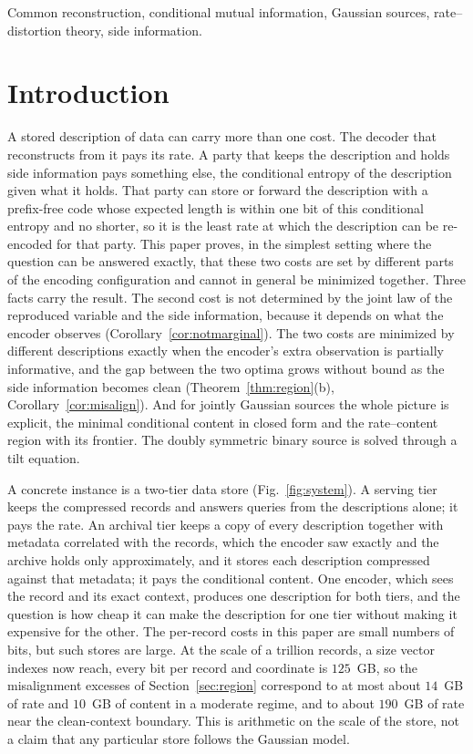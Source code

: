 \documentclass[11pt,onecolumn]{IEEEtran}
\begin{document}
\begin{IEEEkeywords}
Common reconstruction, conditional mutual information, Gaussian sources,
rate--distortion theory, side information.
\end{IEEEkeywords}

\section{Introduction}
\label{sec:intro}

A stored description of data can carry more than one cost. The decoder
that reconstructs from it pays its rate. A party that keeps the description
and holds side information pays something else, the conditional entropy
of the description given what it holds. That party can store or forward
the description with a prefix-free code whose expected length is within
one bit of this conditional entropy and no shorter, so it is the least
rate at which the description can be re-encoded for that party. This
paper proves, in the simplest setting where the question can be answered
exactly, that these two costs are set by different parts of the encoding
configuration and cannot in general be minimized together. Three facts
carry the result. The second cost is not determined by the joint law of
the reproduced variable and the side information, because it depends on
what the encoder observes (Corollary~\ref{cor:notmarginal}). The two costs
are minimized by different descriptions exactly when the encoder's extra
observation is partially informative, and the gap between the two optima
grows without bound as the side information becomes clean
(Theorem~\ref{thm:region}(b), Corollary~\ref{cor:misalign}). And for jointly
Gaussian sources the whole picture is explicit, the minimal conditional
content in closed form and the rate--content region with its frontier.
The doubly symmetric binary source is solved through a tilt equation.

A concrete instance is a two-tier data store (Fig.~\ref{fig:system}). A
serving tier keeps the compressed records and answers queries from the
descriptions alone; it pays the rate. An archival tier keeps a copy of
every description together with metadata correlated with the records,
which the encoder saw exactly and the archive holds only approximately,
and it stores each description compressed against that metadata; it
pays the conditional content. One encoder, which sees the record and
its exact context, produces one description for both tiers, and the
question is how cheap it can make the description for one tier without
making it expensive for the other. The per-record costs in this paper are
small numbers of bits, but such stores are large. At the scale of a
trillion records, a size vector indexes now reach, every bit per record
and coordinate is $125$~GB, so the misalignment excesses of
Section~\ref{sec:region} correspond to at most about $14$~GB of rate and
$10$~GB of content in a moderate regime, and to about $190$~GB of rate
near the clean-context boundary. This
is arithmetic on the scale of the store, not a claim that any particular
store follows the Gaussian model.
\end{document}
